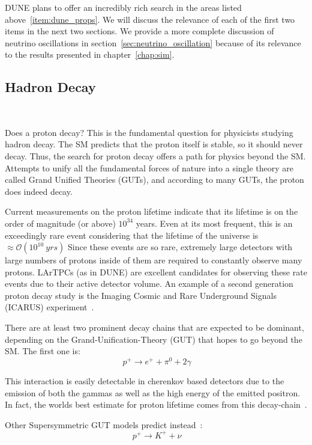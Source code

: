 DUNE plans to offer an incredibly rich search in the areas listed above~\ref{item:dune_props}.
We will discuss the relevance of each of the first two items in the next two sections.
We provide a more complete discussion of neutrino oscillations in section~\ref{sec:neutrino_oscillation} because of its relevance to the results presented in chapter~\ref{chap:sim}.


\subsection{Hadron Decay}~\label{sec:hadron_decay}

Does a proton decay?
This is the fundamental question for physicists studying hadron decay.
The SM predicts that the proton itself is stable, so it should never decay.
Thus, the search for proton decay offers a path for physics beyond the SM.
Attempts to unify all the fundamental forces of nature into a single theory are called Grand Unified Theories (GUTs), and according to many GUTs, the proton does indeed decay.

Current measurements on the proton lifetime indicate that its lifetime is on the order of magnitude (or above) $10^{34}$ years.
Even at its most frequent, this is an exceedingly rare event considering that the lifetime of the universe is $\approx \mathcal{O}(10^{10}~\unit{yrs})$
Since these events are so rare, extremely large detectors with large numbers of protons inside of them are required to constantly observe many protons.
LArTPCs (as in DUNE) are excellent candidates for observing these rate events due to their active detector volume.
An example of a second generation proton decay study is the Imaging Cosmic and Rare Underground Signals (ICARUS) experiment~\citep{ICARUS_2001}.

There are at least two prominent decay chains that are expected to be dominant, depending on the Grand-Unification-Theory (GUT) that hopes to go beyond the SM.
The first one is:
\begin{equation}~\label{eq:rxn_proton_decay1}
  p^{+} \rightarrow e^{+} + \pi^{0} + 2 \gamma
\end{equation}


This interaction is easily detectable in cherenkov based detectors due to the emission of both the gammas as well as the high energy of the emitted positron.
In fact, the worlds best estimate for proton lifetime comes from this decay-chain~\citep{PhysRevD.95.012004}.

Other Supersymmetric GUT models predict instead~\citep{PhysRevD.38.1479}:
\begin{equation}~\label{eq:rxn_proton_decay2}
  p^{+} \rightarrow K^{+} + \nu
\end{equation}

